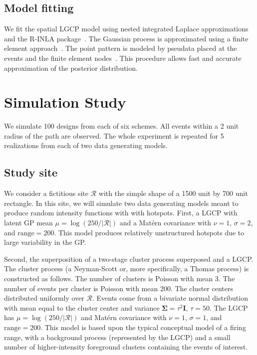 \documentclass[review]{elsarticle}
\begin{document}


\subsection{Model fitting}

We fit the spatial LGCP model using nested integrated Laplace approximations
and the R-INLA package~\citep{rueetal,rinla}. The Gaussian process is
approximated using a finite element approach~\citep{lindgrenetal}. The point
pattern is modeled by pseudata placed at the events and the finite element
nodes~\citep{simpsonetal}. This procedure allows fast and accurate
approximation of the posterior distribution.%


\section{Simulation Study}

We simulate 100 designs from each of six schemes. All events within a 2 unit
radius of the path are observed. The whole experiment is repeated for 5
realizations from each of two data generating models.


\subsection{Study site}

We consider a fictitious site \(\mathcal{R}\) with the simple shape of a 1500
unit by 700 unit rectangle. In this site, we will simulate two data generating
models meant to produce random intensity functions with with hotspots. First,
a LGCP with latent GP mean \(\mu = \log(250 / |\mathcal{R}|)\) and a
Mat\'{e}rn covariance with \(\nu = 1\), \(\sigma = 2\), and
\(\text{range} = 200\). This model produces relatively unstructured hotspots
due to large variability in the GP.

Second, the superposition of a two-stage cluster process superposed and a
LGCP. The cluster process (a Neyman-Scott or, more specifically, a Thomas
process) is constructed as follows. The number of clusters is Poisson with
mean 3. The number of events per cluster is Poisson with mean 200. The cluster
centers distributed uniformly over \(\mathcal{R}\). Events come from a
bivariate normal distribution with mean equal to the cluster center and
variance \(\boldsymbol{\Sigma} = \tau^{2}\mathbf{I}\), \(\tau = 50\). The LGCP
has \(\mu = \log(250 / |\mathcal{R}|)\) and Mat\'{e}rn covariance with
\(\nu = 1\), \(\sigma = 1\), and \(\text{range} = 200\). This model is based
upon the typical conceptual model of a firing range, with a background process
(represented by the LGCP) and a small number of higher-intensity foreground
clusters containing the events of interest.
\end{document}
